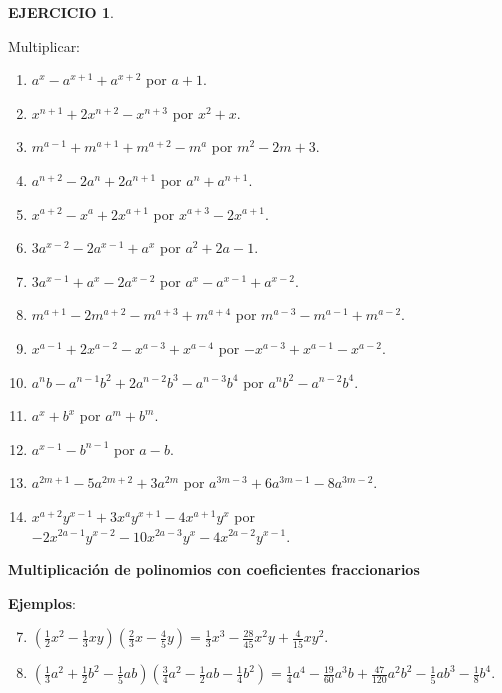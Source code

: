 \documentclass[12pt,letterpaper]{article}
\theoremstyle{definition}
\newtheorem{ejer}{EJERCICIO}
\begin{document}
\vspace{1mm}

\begin{ejer}\

Multiplicar: %
\begin{enumerate}
\item $a^x-a^{x+1}+a^{x+2}$ por $a+1$.
\item $x^{n+1}+2x^{n+2}-x^{n+3}$ por $x^2+x$.
\item $m^{a-1}+m^{a+1}+m^{a+2}-m^a$ por $m^2-2m+3$.
\item $a^{n+2}-2a^n+2a^{n+1}$ por $a^n+a^{n+1}$.
\item $x^{a+2}-x^a+2x^{a+1}$ por $x^{a+3}-2x^{a+1}$.
\item $3a^{x-2}-2a^{x-1}+a^x$ por $a^2+2a-1$.
\item $3a^{x-1}+a^x-2a^{x-2}$ por $a^x-a^{x-1}+a^{x-2}$.
\item $m^{a+1}-2m^{a+2}-m^{a+3}+m^{a+4}$ por $m^{a-3}-m^{a-1}+m^{a-2}$.
\item $x^{a-1}+2x^{a-2}-x^{a-3}+x^{a-4}$ por $-x^{a-3}+x^{a-1}-x^{a-2}$.
\item $a^nb-a^{n-1}b^2+2a^{n-2}b^3-a^{n-3}b^4$ por $ a^nb^2-a^{n-2}b^4$.
\item $a^x+b^x$ por $a^m+b^m$.
\item $a^{x-1}-b^{n-1}$ por $a-b$.
\item $a^{2m+1}-5a^{2m+2}+3a^{2m}$ por $a^{3m-3}+6a^{3m-1}-8a^{3m-2}$.
\item $x^{a+2}y^{x-1}+3x^ay^{x+1}-4x^{a+1}y^x$ por $-2x^{2a-1}y^{x-2}-10x^{2a-3}y^x-4x^{2a-2}y^{x-1}$.
\end{enumerate}
\end{ejer}

\pagebreak

\textbf{Multiplicación de polinomios con coeficientes fraccionarios}

\textbf{Ejemplos}: %
\begin{enumerate}
\setcounter{enumi}{6}
\item $\left(\frac{1}{2}x^2-\frac{1}{3}xy\right)\left(\frac{2}{3}x-\frac{4}{5}y\right)=\frac{1}{3}x^3-\frac{28}{45}x^2y+\frac{4}{15}xy^2$.
\item $\left(\frac{1}{3}a^2+\frac{1}{2}b^2-\frac{1}{5}ab\right)\left(\frac{3}{4}a^2-\frac{1}{2}ab-\frac{1}{4}b^2\right)=\frac{1}{4}a^4-\frac{19}{60}a^3b+\frac{47}{120}a^2b^2-\frac{1}{5}ab^3-\frac{1}{8}b^4$.
\end{enumerate}
\end{document}
